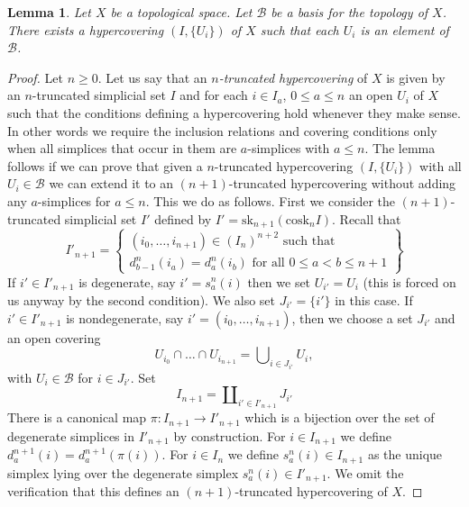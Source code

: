\documentclass[10pt,a4paper]{article}
\theoremstyle{plain}
\newtheorem{lemma}[subsection]{Lemma}
\theoremstyle{definition}
\theoremstyle{remark}
\numberwithin{equation}{subsection}
\begin{document}
\begin{lemma}
\label{lemma-basis-hypercovering}
Let $X$ be a topological space.
Let $\mathcal{B}$ be a basis for the topology of $X$.
There exists a hypercovering $(I, \{U_i\})$ of $X$
such that each $U_i$ is an element of $\mathcal{B}$.
\end{lemma}

\begin{proof}
Let $n \geq 0$.
Let us say that an {\it $n$-truncated hypercovering} of $X$ is
given by an $n$-truncated simplicial set $I$ and for each
$i \in I_a$, $0 \leq a \leq n$ an open $U_i$ of $X$ such that
the conditions defining a hypercovering hold whenever they make sense.
In other words we require the inclusion relations and covering
conditions only when all simplices that occur in them
are $a$-simplices with $a \leq n$. The lemma follows if we can prove
that given a $n$-truncated hypercovering $(I, \{U_i\})$ with
all $U_i \in \mathcal{B}$ we can extend it to an $(n + 1)$-truncated
hypercovering without adding any $a$-simplices for $a \leq n$.
This we do as follows. First we consider the $(n + 1)$-truncated
simplicial set $I'$ defined by
$I' = \text{sk}_{n + 1}(\text{cosk}_n I)$.
Recall that
$$
I'_{n + 1} =
\left\{
\begin{matrix}
(i_0, \ldots, i_{n + 1}) \in (I_n)^{n + 2} \text{ such that}\\
d^n_{b - 1}(i_a) = d^n_a(i_b) \text{ for all }0\leq a < b\leq n + 1
\end{matrix}
\right\}
$$
If $i' \in I'_{n + 1}$ is degenerate, say $i' = s^n_a(i)$ then we set
$U_{i'} = U_i$ (this is forced on us anyway by the second condition).
We also set $J_{i'} = \{i'\}$ in this case.
If $i' \in I'_{n + 1}$ is nondegenerate, say
$i' = (i_0, \ldots, i_{n + 1})$, then we choose a set
$J_{i'}$ and an open covering
\begin{equation}
\label{equation-choose-covering}
U_{i_0} \cap \ldots \cap U_{i_{n + 1}} =
\bigcup\nolimits_{i \in J_{i'}} U_i,
\end{equation}
with $U_i \in \mathcal{B}$ for $i \in J_{i'}$.
Set
$$
I_{n + 1} = \coprod\nolimits_{i' \in I'_{n + 1}} J_{i'}
$$
There is a canonical map $\pi : I_{n + 1} \to I'_{n + 1}$ which is
a bijection over the set of degenerate simplices in $I'_{n + 1}$ by
construction.
For $i \in I_{n + 1}$ we define $d^{n + 1}_a(i) = d^{n + 1}_a(\pi(i))$.
For $i \in I_n$ we define $s^n_a(i) \in I_{n + 1}$ as the unique
simplex lying over the degenerate simplex $s^n_a(i) \in I'_{n + 1}$.
We omit the verification that this defines an $(n + 1)$-truncated
hypercovering of $X$.
\end{proof}
\end{document}
